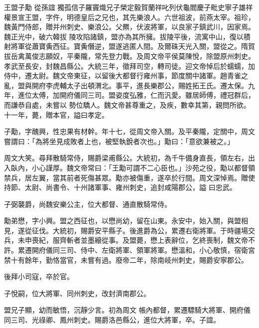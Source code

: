 
\begin{pinyinscope}

 王盟子勱
 從孫誼
 獨孤信子羅竇熾兄子榮定毅賀蘭祥叱列伏龜閻慶子毗史寧子雄祥權景宣王盟，字仵，明德皇后之兄也，其先樂浪人。六世祖波，前燕太宰。祖珍，魏黃門侍郎，贈并州刺史、樂浪公。父羆，伏波將軍，以良家子鎮武川，因家焉。魏正光中，破六韓拔
 陵攻陷諸鎮，盟亦為其所擁。拔陵平後，流寓中山，復以積射將軍從蕭寶夤西征。寶夤僭逆，盟遂逃匿人間。及爾硃天光入關，盟從之。隋賀拔岳禽萬俊志願奴，平秦隴，常先登力戰。及周文帝平侯莫陳悅，除盟原州刺史。孝武至長安，封魏昌縣公。大統三年，徵拜司空，轉司徒。迎文帝悼后於蠕蠕，加侍中，遷太尉。魏文帝東征，以留後大都督行雍州事，節度關中諸軍。趙青雀之亂，盟與開府李虎輔太子出頓渭北。事平，進長樂郡公，賜姓拓王氏。遷太保。九年，進位太傅，加開府儀同三司。盟姿度弘雅，仁而汎愛。雖居師傅，禮冠群后，而謙恭自處，未嘗以
 勢位驕人。魏文帝甚尊重之，及疾，數幸其第，親問所欲。十一年，薨，贈本官，謚曰孝定。



 子勱，字醜興，性忠果有材幹。年十七，從周文帝入關。及平秦隴，定關中，周文嘗謂曰：「為將坐見成敗者上也，被堅執銳者次也。」勱曰：「意欲兼被之。」



 周文大笑。尋拜散騎常侍，賜爵梁甫縣公。大統初，為千牛備身直長，領左右，出入臥內，小心謹厚。魏文帝常曰：「王勱可謂不二心臣也。」沙苑之役，勱以都督領禁兵，居左翼，當其前者死傷甚眾。勱亦被傷重，遂卒於行間。周文深悼焉。贈使持節、太尉、尚書令、十州諸軍事、雍州刺史，追封咸陽郡公，謚
 曰忠武。



 子弼襲爵，尚魏安樂公主，位大都督、通直散騎常侍。



 勱弟懋，字小興。盟之西征也，以懋尚幼，留在山東。永安中，始入關，與盟相見，遂從征伐。大統初，賜爵安平縣子。後進爵為公，累遷右衛將軍。于時疆場交兵，未申喪紀，服齊斬者並墨縗從事。及盟薨，懋上表辭位，乞終喪制，魏文帝不許。累遷開府儀同三司、侍中、左衛將軍、領軍將軍。懋溫和，小心敬慎，宿衛宮禁十有餘年，勤恪當官，未嘗有過。廢帝二年，除南岐州刺史，賜爵安寧郡公。



 後拜小司寇，卒於官。



 子悅嗣，位大將軍、同州刺史，改封濟南郡公。



 盟兄子顯，幼而敏悟，沉靜少言。初為周文
 帳內都督，累遷驃騎大將軍、開府儀同三司、光祿卿、鳳州刺史。賜爵洛邑縣公，進位大將軍，卒。子誼。




\end{pinyinscope}
